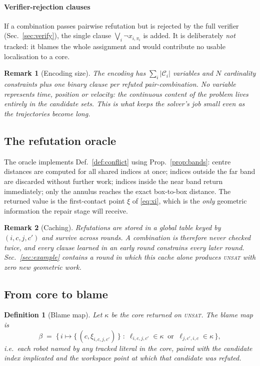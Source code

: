 \documentclass[conference]{IEEEtran}
\newtheorem{definition}{Definition}
\newtheorem{remark}{Remark}
\newcommand{\Cand}{\mathcal{C}}
\begin{document}
\paragraph*{Verifier-rejection clauses}
If a combination passes pairwise refutation but is rejected by the full verifier
(Sec.~\ref{sec:verify}), the single clause $\bigvee_i \neg x_{i,\pi_i}$ is added. It is
deliberately \emph{not} tracked: it blames the whole assignment and would contribute no
usable localisation to a core.

\begin{remark}[Encoding size]
The encoding has $\sum_i |\Cand_i|$ variables and $N$ cardinality constraints plus one
binary clause per refuted pair-combination. No variable represents time, position or
velocity: the continuous content of the problem lives entirely in the candidate sets.
This is what keeps the solver's job small even as the trajectories become long.
\end{remark}

\subsection{The refutation oracle}
\label{sec:oracle}

The oracle implements Def.~\ref{def:conflict} using Prop.~\ref{prop:bands}: centre
distances are computed for all shared indices at once; indices outside the far band are
discarded without further work; indices inside the near band return immediately; only the
annulus reaches the exact box-to-box distance. The returned value is the first-contact
point $\xi$ of \eqref{eq:xi}, which is the \emph{only} geometric information the repair
stage will receive.

\begin{remark}[Caching]
Refutations are stored in a global table keyed by $(i,c,j,c')$ and survive across rounds.
A combination is therefore never checked twice, and every clause learned in an early round
constrains every later round. Sec.~\ref{sec:example} contains a round in which this cache
alone produces \textsc{unsat} with zero new geometric work.
\end{remark}

\subsection{From core to blame}
\label{sec:core}

\begin{definition}[Blame map]
\label{def:blame}
Let $\kappa$ be the core returned on \textsc{unsat}. The \emph{blame map} is
\begin{equation}
  \beta \;=\; \big\{\, i \mapsto \{\,(c, \xi_{i,c,j,c'}) \,\}
  \;:\; \ell_{i,c,j,c'} \in \kappa \ \text{ or } \ \ell_{j,c',i,c} \in \kappa \,\big\},
  \label{eq:blame}
\end{equation}
i.e.\ each robot named by any tracked literal in the core, paired with the candidate index
implicated and the workspace point at which that candidate was refuted.
\end{definition}
\end{document}
